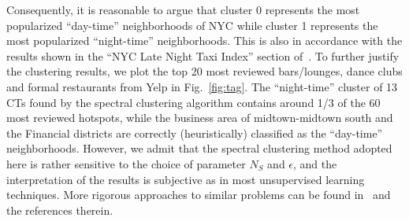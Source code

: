 \documentclass[journal]{IEEEtran}
\begin{document}
Consequently, it is reasonable to argue that cluster 0 represents the most
popularized ``day-time'' neighborhoods of NYC while cluster 1 represents the most
popularized ``night-time'' neighborhoods. This is also in accordance with
the results shown in the ``NYC Late Night Taxi Index'' section
of~\cite{schneider2015analyzing}. To further justify the clustering results, we
plot the top 20 most reviewed bars/lounges, dance clubs and formal restaurants
from Yelp in Fig.~\ref{fig:tag}. The ``night-time'' cluster of 13 CTs found by
the spectral clustering algorithm contains around 1/3 of the 60 most reviewed
hotspots, while the business area of midtown-midtown south and the Financial
districts are correctly (heuristically) classified as the ``day-time''
neighborhoods. However, we admit that the spectral clustering method
adopted here is rather sensitive to the choice of parameter $N_S$ and
$\epsilon$, and the interpretation of the results is subjective as in most
unsupervised learning techniques. More rigorous approaches to similar
problems can be found in~\cite{Yuan:2012:DRD:2339530.2339561} and the references
therein.
\end{document}
